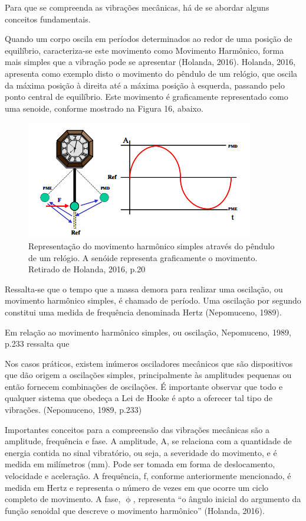 \documentclass[
	12pt,				
	oneside,			
	a4paper,			
	english,			
	brazil				
	]{abntex2ppgsi}
\begin{document}
Para que se compreenda as vibrações mecânicas, há de se abordar alguns conceitos fundamentais. 

Quando um corpo oscila em períodos determinados ao redor de uma posição de equilíbrio, caracteriza-se este movimento como Movimento Harmônico, forma mais simples que a vibração pode se apresentar (Holanda, 2016). Holanda, 2016, apresenta como exemplo disto o movimento do pêndulo de um relógio, que oscila da máxima posição à direita até a máxima posição à esquerda, passando pelo ponto central de equilíbrio. Este movimento é graficamente representado como uma senoide, conforme mostrado na Figura 16, abaixo.

\begin{figure}[!htb]
\centering
\includegraphics{Figura16}
\caption {Representação do movimento harmônico simples através do pêndulo de um relógio. A senóide representa graficamente o movimento. Retirado de Holanda, 2016, p.20}
\label{Figura16}
\end{figure}

Ressalta-se que o tempo que a massa demora para realizar uma oscilação, ou movimento harmônico simples, é chamado de período. Uma oscilação por segundo constitui uma medida de frequência denominada Hertz (Nepomuceno, 1989). 

Em relação ao movimento harmônico simples, ou oscilação, Nepomuceno, 1989, p.233 ressalta que

\begin{citacao}
Nos casos práticos, existem inúmeros osciladores mecânicos que são dispositivos que dão origem a oscilações simples, principalmente às amplitudes pequenas ou então fornecem combinações de oscilações. É importante observar que todo e qualquer sistema que obedeça a Lei de Hooke é apto a oferecer tal tipo de vibrações. (Nepomuceno, 1989, p.233)
\end{citacao}

Importantes conceitos para a compreensão das vibrações mecânicas são a amplitude, frequência e fase. A amplitude, A, se relaciona com a quantidade de energia contida no sinal vibratório, ou seja, a severidade do movimento, e é medida em milímetros (mm). Pode ser tomada em forma de deslocamento, velocidade e aceleração.  A frequência, f, conforme anteriormente mencionado, é medida em Hertz e representa o número de vezes em que ocorre um ciclo completo de movimento. A fase, $\upphi$, representa “o ângulo inicial do argumento da função senoidal que descreve o movimento harmônico” (Holanda, 2016).
 
\end{document}
